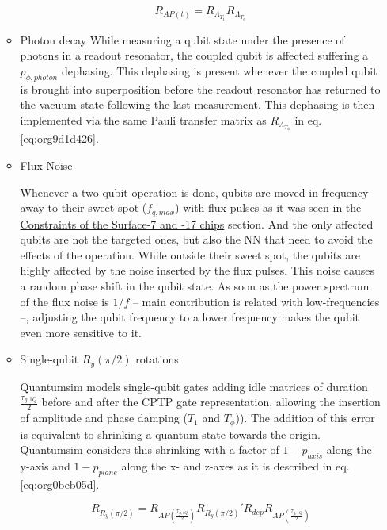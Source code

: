 \begin{itemize}
\begin{itemize}
\begin{equation}
\label{eq:org9d1d426}
R_{AP (t)} = R_{\Lambda_{T_1}} R_{\Lambda_{T_{\phi}}}
\end{equation}

\item Photon decay
\label{sec:org26f8266}
While measuring a qubit state under the presence of photons in a readout resonator, the coupled qubit is affected suffering a \(p_{\phi, photon}\) dephasing.
This dephasing is present whenever the coupled qubit is brought into superposition before the readout resonator has returned to the vacuum state following the last measurement.
This dephasing is then implemented via the same Pauli transfer matrix as \(R_{\Lambda_{T_{\phi}}}\) in eq. \ref{eq:org9d1d426}.

\item Flux Noise
\label{sec:orgecc3078}

Whenever a two-qubit operation is done, qubits are moved in frequency away to their sweet spot (\(f_{q,max}\)) with flux pulses as it was seen in the \href{chapter-3.org}{Constraints of the Surface-7 and -17 chips} section.
And the only affected qubits are not the targeted ones, but also the NN that need to avoid the effects of the operation.
While outside their sweet spot, the qubits are highly affected by the noise inserted by the flux pulses.
This noise causes a random phase shift in the qubit state.
As soon as the power spectrum of the flux noise is \(1/f\) -- main contribution is related with low-frequencies --, adjusting the qubit frequency to a lower frequency makes the qubit even more sensitive to it.

\item Single-qubit \(R_y(\pi /2)\) rotations
\label{sec:org9fee397}

Quantumsim models single-qubit gates adding idle matrices of duration \(\frac{\tau_{g,1Q}}{2}\) before and after the CPTP gate representation, allowing the insertion of amplitude and phase damping (\(T_1\) and \(T_{\phi}\))).
The addition of this error is equivalent to shrinking a quantum state towards the origin.
Quantumsim considers this shrinking with a factor of \(1 - p_{axis}\) along the y-axis and \(1 - p_{plane}\) along the x- and z-axes as it is described in eq. \ref{eq:org0beb05d}.

\begin{equation}
\label{eq:org0beb05d}
R_{R_y (\pi /2)} = R_{AP (\frac{\tau_{g,1Q}}{2})} R_{R_y (\pi /2)}' R_{dep} R_{AP (\frac{\tau_{g,1Q}}{2})}
\end{equation}


\end{itemize}
\end{itemize}

